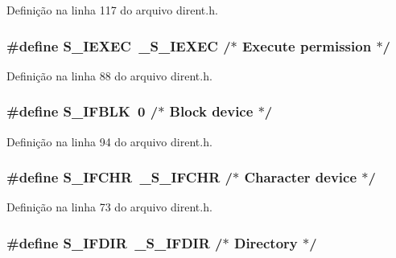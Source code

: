 Definição na linha 117 do arquivo dirent.\+h.

\subsubsection[{S\+\_\+\+I\+E\+X\+EC}]{\setlength{\rightskip}{0pt plus 5cm}\#define S\+\_\+\+I\+E\+X\+EC~\+\_\+\+S\+\_\+\+I\+E\+X\+EC                    /$\ast$ Execute permission $\ast$/}\label{dirent_8h_a49a6665b56f38f52ee9b157cefcf4d68}


Definição na linha 88 do arquivo dirent.\+h.

\subsubsection[{S\+\_\+\+I\+F\+B\+LK}]{\setlength{\rightskip}{0pt plus 5cm}\#define S\+\_\+\+I\+F\+B\+LK~0                          /$\ast$ Block device $\ast$/}\label{dirent_8h_a5c5b74a1cb1a1ae83572500b94e1938f}


Definição na linha 94 do arquivo dirent.\+h.

\subsubsection[{S\+\_\+\+I\+F\+C\+HR}]{\setlength{\rightskip}{0pt plus 5cm}\#define S\+\_\+\+I\+F\+C\+HR~\+\_\+\+S\+\_\+\+I\+F\+C\+HR                    /$\ast$ Character device $\ast$/}\label{dirent_8h_aef3a1d1ba22c83e30b5c834dd343b2a8}


Definição na linha 73 do arquivo dirent.\+h.

\subsubsection[{S\+\_\+\+I\+F\+D\+IR}]{\setlength{\rightskip}{0pt plus 5cm}\#define S\+\_\+\+I\+F\+D\+IR~\+\_\+\+S\+\_\+\+I\+F\+D\+IR                    /$\ast$ Directory $\ast$/}\label{dirent_8h_a11fb0652b963a735f3377eb1c9239f2d}


